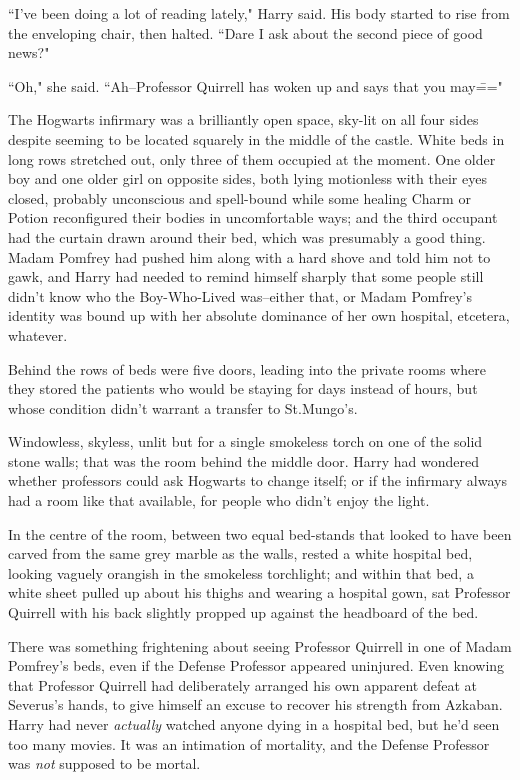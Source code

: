``I've been doing a lot of reading lately," Harry said. His body started to rise from the enveloping chair, then halted. ``Dare I ask about the second piece of good news?"

``Oh," she said. ``Ah\---Professor Quirrell has woken up and says that you may\==="

\later

The Hogwarts infirmary was a brilliantly open space, sky-lit on all four sides despite seeming to be located squarely in the middle of the castle. White beds in long rows stretched out, only three of them occupied at the moment. One older boy and one older girl on opposite sides, both lying motionless with their eyes closed, probably unconscious and spell-bound while some healing Charm or Potion reconfigured their bodies in uncomfortable ways; and the third occupant had the curtain drawn around their bed, which was presumably a good thing. Madam Pomfrey had pushed him along with a hard shove and told him not to gawk, and Harry had needed to remind himself sharply that some people still didn't know who the Boy-Who-Lived was\---either that, or Madam Pomfrey's identity was bound up with her absolute dominance of her own hospital, etcetera, whatever.

Behind the rows of beds were five doors, leading into the private rooms where they stored the patients who would be staying for days instead of hours, but whose condition didn't warrant a transfer to St.\?Mungo's.

Windowless, skyless, unlit but for a single smokeless torch on one of the solid stone walls; that was the room behind the middle door. Harry had wondered whether professors could ask Hogwarts to change itself; or if the infirmary always had a room like that available, for people who didn't enjoy the light.

In the centre of the room, between two equal bed-stands that looked to have been carved from the same grey marble as the walls, rested a white hospital bed, looking vaguely orangish in the smokeless torchlight; and within that bed, a white sheet pulled up about his thighs and wearing a hospital gown, sat Professor Quirrell with his back slightly propped up against the headboard of the bed.

There was something frightening about seeing Professor Quirrell in one of Madam Pomfrey's beds, even if the Defense Professor appeared uninjured. Even knowing that Professor Quirrell had deliberately arranged his own apparent defeat at Severus's hands, to give himself an excuse to recover his strength from Azkaban. Harry had never \emph{actually} watched anyone dying in a hospital bed, but he'd seen too many movies. It was an intimation of mortality, and the Defense Professor was \emph{not} supposed to be mortal.

